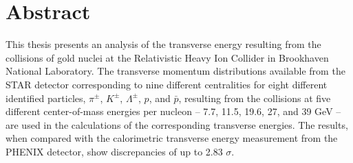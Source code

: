 \chapter*{Abstract}\label{ch:abstract}

This thesis presents an analysis of the transverse energy resulting from the collisions of gold nuclei at the Relativistic Heavy Ion Collider in Brookhaven National Laboratory. The transverse momentum distributions available from the STAR detector corresponding to nine different centralities for eight different identified particles, $\pi^\pm$, $K^\pm$, $\Lambda^\pm$, $p$, and $\bar{p}$, resulting from the collisions at five different center-of-mass energies per nucleon -- 7.7, 11.5, 19.6, 27, and 39 GeV -- are used in the calculations of the corresponding transverse energies. The results, when compared with the calorimetric transverse energy measurement from the PHENIX detector, show discrepancies of up to 2.83 $\sigma$.
